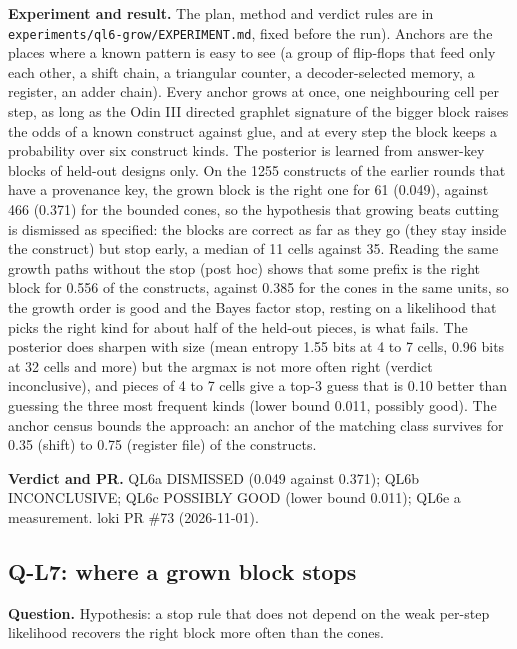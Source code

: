 \documentclass[conference]{IEEEtran}
\newcommand{\hev}[1]{\par\smallskip\noindent\textbf{#1}}
\newcommand{\code}[1]{\texttt{#1}}
\begin{document}
\hev{Experiment and result.} The plan, method and verdict rules are in
\code{experiments/ql6-grow/EXPERIMENT.md}, fixed before the run). Anchors are the places where a known pattern is easy to see (a group of flip-flops that
feed only each other, a shift chain, a triangular counter, a decoder-selected memory, a register, an adder chain). Every anchor grows at once, one neighbouring
cell per step, as long as the Odin III directed graphlet signature of the bigger block raises the odds of a known construct against glue, and at every step the
block keeps a probability over six construct kinds. The posterior is learned from answer-key blocks of held-out designs only. On the 1255 constructs of the
earlier rounds that have a provenance key, the grown block is the right one for 61 (0.049), against 466 (0.371) for the bounded cones, so the hypothesis that
growing beats cutting is dismissed as specified: the blocks are correct as far as they go (they stay inside the construct) but stop early, a median of 11
cells against 35. Reading the same growth paths without the stop (post hoc) shows that some prefix is the right block for 0.556 of the constructs, against 0.385
for the cones in the same units, so the growth order is good and the Bayes factor stop, resting on a likelihood that picks the right kind for about half of the
held-out pieces, is what fails. The posterior does sharpen with size (mean entropy 1.55 bits at 4 to 7 cells, 0.96 bits at 32 cells and more) but the argmax is
not more often right (verdict inconclusive), and pieces of 4 to 7 cells give a top-3 guess that is 0.10 better than guessing the three most frequent kinds
(lower bound 0.011, possibly good). The anchor census bounds the approach: an anchor of the matching class survives for 0.35 (shift) to 0.75 (register file) of
the constructs.

\hev{Verdict and PR.} QL6a DISMISSED (0.049 against 0.371); QL6b INCONCLUSIVE; QL6c POSSIBLY GOOD (lower bound 0.011); QL6e a measurement. loki PR \#73 (2026-11-01).

\subsection{Q-L7: where a grown block stops}
\label{rec:ql7}

\hev{Question.} Hypothesis: a stop rule that does not depend on the weak per-step likelihood recovers the right block more often than the cones.
\end{document}
